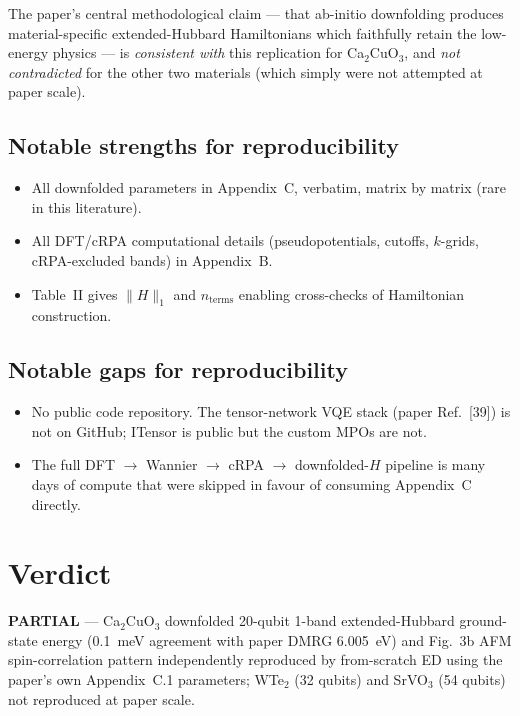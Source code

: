 \documentclass[11pt]{article}
\begin{document}
\noindent The paper's central methodological claim --- that ab-initio downfolding produces material-specific extended-Hubbard Hamiltonians which faithfully retain the low-energy physics --- is \emph{consistent with} this replication for Ca$_2$CuO$_3$, and \emph{not contradicted} for the other two materials (which simply were not attempted at paper scale).

\subsection*{Notable strengths for reproducibility}
\begin{itemize}
    \item All downfolded parameters in Appendix~C, verbatim, matrix by matrix (rare in this literature).
    \item All DFT/cRPA computational details (pseudopotentials, cutoffs, $k$-grids, cRPA-excluded bands) in Appendix~B.
    \item Table~II gives $\|H\|_1$ and $n_\text{terms}$ enabling cross-checks of Hamiltonian construction.
\end{itemize}

\subsection*{Notable gaps for reproducibility}
\begin{itemize}
    \item No public code repository. The tensor-network VQE stack (paper Ref.~[39]) is not on GitHub; ITensor is public but the custom MPOs are not.
    \item The full DFT $\to$ Wannier $\to$ cRPA $\to$ downfolded-$H$ pipeline is many days of compute that were skipped in favour of consuming Appendix~C directly.
\end{itemize}



\section*{Verdict}
\textbf{PARTIAL} --- Ca$_2$CuO$_3$ downfolded 20-qubit 1-band extended-Hubbard ground-state energy (0.1~meV agreement with paper DMRG 6.005~eV) and Fig.~3b AFM spin-correlation pattern independently reproduced by from-scratch ED using the paper's own Appendix~C.1 parameters; WTe$_2$ (32 qubits) and SrVO$_3$ (54 qubits) not reproduced at paper scale.
\end{document}
